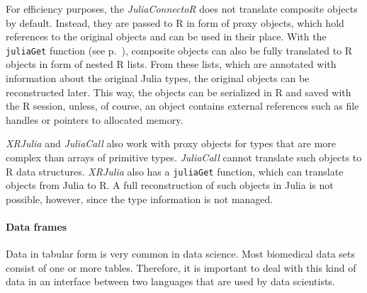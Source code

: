 \documentclass[12pt]{article}
\newcommand{\inlinecode}[1]{\texttt{#1}}
\newcommand{\apkg}[1]{\emph{#1}}
\begin{document}
For efficiency purposes, the \apkg{JuliaConnectoR} does not translate composite objects by default.
Instead, they are passed to R in form of proxy objects, which hold references to the original objects and can be used in their place.
With the \inlinecode{juliaGet} function (see p.~\pageref{rdokitem_juliaGet}), composite objects can also be fully translated to R objects in form of nested R lists.
From these lists, which are annotated with information about the original Julia types, the original objects can be reconstructed later.
This way, the objects can be serialized in R and saved with the R session, unless, of course, an object contains external references such as file handles or pointers to allocated memory.

\apkg{XRJulia} and \apkg{JuliaCall} also work with proxy objects for types that are more complex than arrays of primitive types.
\apkg{JuliaCall} cannot translate such objects to R data structures.
\apkg{XRJulia} also has a \inlinecode{juliaGet} function, which can translate objects from Julia to R.
A full reconstruction of such objects in Julia is not possible, however, since the type information is not managed.


\paragraph{Data frames}\label{juliaconnectordataframes}

Data in tabular form is very common in data science. Most biomedical data sets consist of one or more tables.
Therefore, it is important to deal with this kind of data in an interface between two languages that are used by data scientists.
\end{document}
